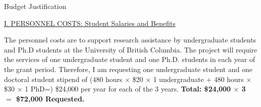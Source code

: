 \documentclass[12pt,letterpaper]{article}
\begin{document}
\begin{center}
{\large Budget Justification}

\medskip
\end{center}

\noindent \underline{I. PERSONNEL COSTS: Student Salaries and
Benefits}\smallskip

\noindent The personnel costs are to support research assistance
by  undergraduate students and Ph.D students at the University of British Columbia. The project
will require the services of one undergraduate student and one Ph.D. students in each year of the
grant period. 
Therefore, I am requesting one undergraduate student and one doctoral student stipend of  ($480$ hours $\times$ \$20 $\times$ 1 undergraduate + $480$ hours $\times$ \$30  $\times$ 1 PhD=) \$24,000 per year for each of the 3
years. \textbf{Total:   \$24,000 $\times$ 3 $=$ \$72,000 Requested.}
\end{document}
